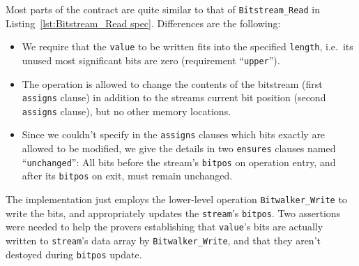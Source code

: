 Most parts of the contract are quite similar to that of
\lstinline{Bitstream_Read} in
Listing~\ref{lst:Bitstream_Read spec}.
%
Differences are the following:
\begin{itemize}
\item We require that the \lstinline{value} to be written fits into
	the specified
	\lstinline{length}, i.e.\ its unused most significant bits
	are zero (requirement
	``\lstinline{upper}'').
\item The operation is allowed to change the contents of the bitstream
	(first \lstinline{assigns} clause) in addition to the streams
	current bit
	position (second \lstinline{assigns} clause), but no other
	memory locations.
\item Since we couldn't specify in the \lstinline{assigns} clauses 
	which bits exactly are allowed to be modified, we give the
	details in two
	\lstinline{ensures} clauses named ``\lstinline{unchanged}'':
	All bits before the stream's \lstinline{bitpos} on operation
	entry, and after
	its \lstinline{bitpos} on exit, must remain unchanged.
\end{itemize}

The implementation just employs the lower-level operation
\lstinline{Bitwalker_Write} to
write the bits, and appropriately updates the \lstinline{stream}'s
\lstinline{bitpos}.
%
Two assertions were needed to help the provers establishing that
\lstinline{value}'s
bits are actually written to \lstinline{stream}'s data array by
\lstinline{Bitwalker_Write}, and that they aren't destoyed during
\lstinline{bitpos} update.




